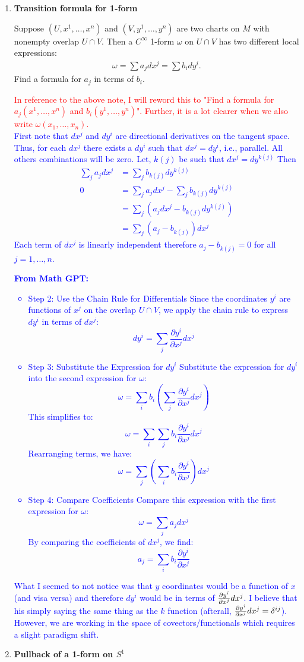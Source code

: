 \documentclass[12pt,a4paper]{report}
\newcommand{\RED}[1]{\textcolor{red}{#1}}
\newcommand{\BLUE}[1]{\textcolor{blue}{#1}}
\begin{document}
\begin{enumerate}[label=\textbf{17.\arabic*.}]
\item \textbf{Transition formula for 1-form}

Suppose $(U, x^1,\dots, x^n)$ and $(V, y^1, \dots, y^n)$ are two charts on $M$ with nonempty overlap $U\cap V$.  Then a $C^\infty$ 1-form $\omega$ on $U\cap V$ has two different local expressions:
\begin{align*}
	\omega = \sum a_jdx^j=\sum b_idy^i.
\end{align*}Find a formula for $a_j$ in terms of $b_i$.

\RED{In reference to the above note, I will reword this to "Find a formula for $a_j(x^1,\dots,x^n)$ and $b_i(y^1, \dots, y^n)$".  Further, it is a lot clearer when we also write $\omega(x_1,\dots,x_n)$.\\
}
\BLUE{First note that $dx^j$ and $dy^i$ are directional derivatives on the tangent space.  Thus, for each $dx^j$ there exists a $dy^i$ such that $dx^j=dy^i$, i.e., parallel.  All others combinations will be zero. Let, $k(j)$ be such that $dx^j=dy^{k(j)}$ Then
\begin{align*}
	\sum_j a_jdx^j &= \sum_j b_{k(j)} dy^{k(j)} \\
	0 &= \sum_j a_jdx^j - \sum_j b_{k(j)} dy^{k(j)} \\	
	&= \sum_j (a_jdx^j - b_{k(j)} dy^{k(j)}) \\
	&= \sum_j (a_j -  b_{k(j)})dx^j
\end{align*}Each term of $dx^j$ is linearly independent therefore $a_j -  b_{k(j)} =0$ for all $j=1,\dots,n$.  \\
}
\BLUE{
\textbf{From Math GPT:}
\begin{itemize}
\item Step 2: Use the Chain Rule for Differentials
Since the coordinates \(y^i\) are functions of \(x^j\) on the overlap \(U \cap V\), we apply the chain rule to express \(dy^i\) in terms of \(dx^j\):
\[
dy^i = \sum_j \frac{\partial y^i}{\partial x^j} dx^j
\]
\item Step 3: Substitute the Expression for \(dy^i\)
Substitute the expression for \(dy^i\) into the second expression for \(\omega\):
\[
\omega = \sum_i b_i \left( \sum_j \frac{\partial y^i}{\partial x^j} dx^j \right)
\]
This simplifies to:
\[
\omega = \sum_i \sum_j b_i \frac{\partial y^i}{\partial x^j} dx^j
\]
Rearranging terms, we have:
\[
\omega = \sum_j \left( \sum_i b_i \frac{\partial y^i}{\partial x^j} \right) dx^j
\]
\item Step 4: Compare Coefficients
Compare this expression with the first expression for \(\omega\):
\[
\omega = \sum_j a_j dx^j
\]
By comparing the coefficients of \(dx^j\), we find:
\[
a_j = \sum_i b_i \frac{\partial y^i}{\partial x^j}
\]
\end{itemize}
\HLINE
What I seemed to not notice was that $y$ coordinates would be a function of $x$ (and visa versa) and therefore $dy^i$ would be in terms of $\frac{\partial y^i}{\partial x^j}dx^j$.  I believe that his simply saying the same thing as the $k$ function (afterall, $\frac{\partial y^i}{\partial x^j}dx^j=\delta^{ij}$).  However, we are working in the space of covectors/functionals which requires a slight paradigm shift.
}
\item \textbf{Pullback of a 1-form on $S^1$}


\end{enumerate}
\end{document}
